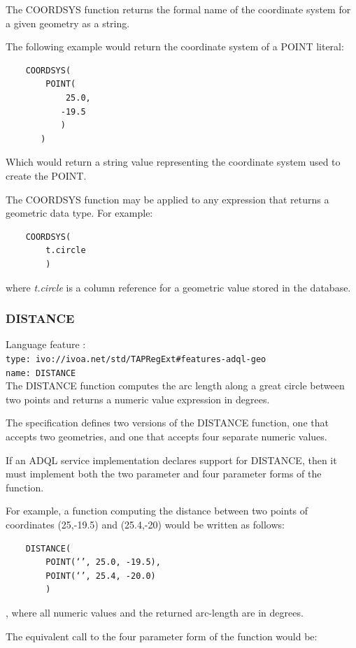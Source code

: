 \documentclass[11pt,a4paper]{ivoa}
\begin{document}
The COORDSYS function returns the formal name of the coordinate system for
a given geometry as a string.

The following example would return the coordinate system of a POINT literal:
\begin{verbatim}
    COORDSYS(
        POINT(
            25.0,
           -19.5
           )
       )
\end{verbatim}
\noindent
Which would return a string value representing the coordinate system used
to create the POINT.

The COORDSYS function may be applied to any expression that returns a
geometric data type. For example:
\begin{verbatim}
    COORDSYS(
        t.circle
        )
\end{verbatim}
\noindent
where \textit{t.circle} is a column reference for a geometric value
stored in the database.

\subsubsection{DISTANCE}
\label{sec:functions.geom.distance}
{\footnotesize Language feature :}\\
{\footnotesize \verb|type: ivo://ivoa.net/std/TAPRegExt#features-adql-geo|}\\
{\footnotesize \verb|name: DISTANCE|}\\

The DISTANCE function computes the arc length along a great circle between two
points and returns a numeric value expression in degrees.

The specification defines two versions of the DISTANCE function, one that
accepts two geometries, and one that accepts four separate numeric
values.

If an ADQL service implementation declares support for DISTANCE,
then it must implement both the two parameter and four parameter
forms of the function.

For example, a function computing the distance between two points of
coordinates (25,-19.5) and (25.4,-20) would be written as follows:

\begin{verbatim}
    DISTANCE(
        POINT(‘’, 25.0, -19.5),
        POINT(‘’, 25.4, -20.0)
        )
\end{verbatim}

, where all numeric values and the returned arc-length are in degrees.

The equivalent call to the four parameter form of the function would be:
\end{document}
